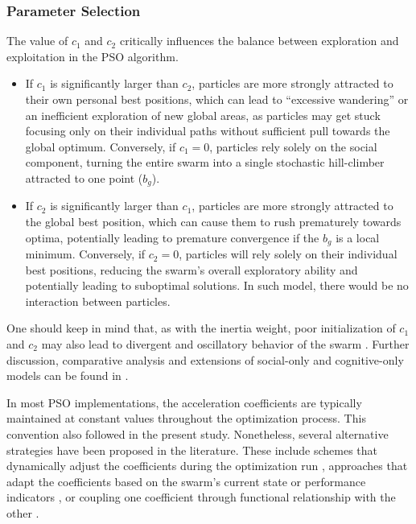 {\subsubsection{Parameter Selection}

The value of $c_1$ and $c_2$ critically influences the balance between exploration and exploitation in the PSO algorithm.
\begin{itemize}
    \item If $c_1$ is significantly larger than $c_2$, particles are more strongly attracted to their own personal best positions, which can lead to ``excessive wandering'' or an inefficient exploration of new global areas, as particles may get stuck focusing only on their individual paths without sufficient pull towards the global optimum.
    Conversely, if $c_1 = 0$, particles rely solely on the social component, turning the entire swarm into a single stochastic hill-climber attracted to one point ($b_g$).
    \item If $c_2$ is significantly larger than $c_1$, particles are more strongly attracted to the global best position, which can cause them to rush prematurely towards optima, potentially leading to premature convergence if the $b_g$ is a local minimum.
    Conversely, if $c_2 = 0$, particles will rely solely on their individual best positions, reducing the swarm's overall exploratory ability and potentially leading to suboptimal solutions. In such model, there would be no interaction between particles.
\end{itemize}
One should keep in mind that, as with the inertia weight, poor initialization of $c_1$ and $c_2$ may also lead to divergent and oscillatory behavior of the swarm \citep[][]{engelbrecht2007computational}. Further discussion, comparative analysis and extensions of social-only and cognitive-only models can be found in \citep[][]{kennedy1997particle,brits2002niching,liu2019hierarchical,chen2025multi}.

In most PSO implementations, the acceleration coefficients are typically maintained at constant values throughout the optimization process. This convention also followed in the present study. Nonetheless, several alternative strategies  have been proposed in the literature.
These include schemes that dynamically adjust the coefficients during the optimization run \citep[e.g.,][]{ratnaweera2002pso,watanabe2024nonlinear,tian2024improved}, approaches that adapt the coefficients based on the swarm's current state or performance indicators \citep[e.g.,][]{zhan2007adaptive,wang2011selfadaptive,wang2018hybrid,bonthagorla2025fast}, or coupling one coefficient through functional relationship with the other \citep[e.g.,][]{cleghorn2022particle,yin2023reinforcement}.

}
